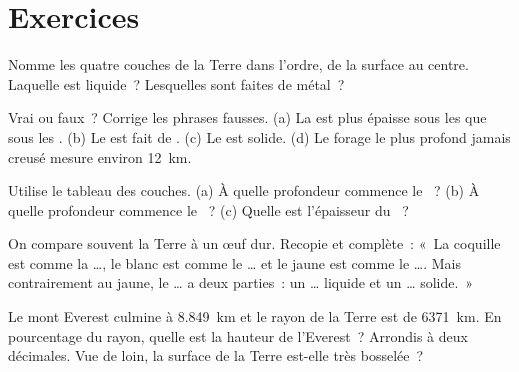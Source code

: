 \section{Exercices}

\begin{exercise}[$\star$]\label{exo:g6:inside-the-earth:1}
Nomme les quatre couches de la Terre dans l'ordre, de la surface au
centre. Laquelle est liquide~? Lesquelles sont faites de métal~?
\end{exercise}

\begin{exercise}[$\star$]\label{exo:g6:inside-the-earth:2}
Vrai ou faux~? Corrige les phrases fausses.
(a) La  est plus épaisse sous les  que sous les .
(b) Le  est fait de .
(c) Le  est solide.
(d) Le forage le plus profond jamais creusé mesure environ 12~km.
\end{exercise}

\begin{exercise}[$\star$]\label{exo:g6:inside-the-earth:3}
Utilise le tableau des couches. (a) À quelle profondeur commence le
~? (b) À quelle profondeur commence le ~? (c) Quelle est
l'épaisseur du ~?
\end{exercise}

\begin{exercise}[$\star$]\label{exo:g6:inside-the-earth:4}
On compare souvent la Terre à un œuf dur. Recopie et complète~: «~La
coquille est comme la \ldots, le blanc est comme le \ldots{} et le jaune
est comme le \ldots{}. Mais contrairement au jaune, le \ldots{} a deux
parties~: un \ldots{} liquide et un \ldots{} solide.~»
\end{exercise}

\begin{exercise}[$\star\star$]\label{exo:g6:inside-the-earth:5}
Le mont Everest culmine à 8.849~km et le rayon de la Terre est de
6371~km. En pourcentage du rayon, quelle est la hauteur de l'Everest~?
Arrondis à deux décimales. Vue de loin, la surface de la Terre est-elle
très bosselée~?
\end{exercise}

